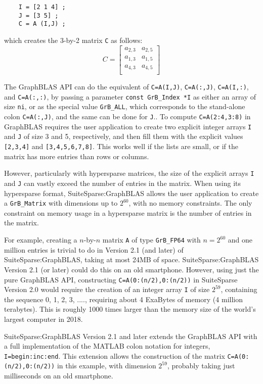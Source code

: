 \documentclass[12pt]{article}
\begin{document}
    {\footnotesize
    \begin{verbatim}
    I = [2 1 4] ;
    J = [3 5] ;
    C = A (I,J) ; \end{verbatim} }
\noindent
which creates the 3-by-2 matrix \verb'C' as follows:
\[
C =
\left[
\begin{array}{cc}
a_{2,3} & a_{2,5} \\
a_{1,3} & a_{1,5} \\
a_{4,3} & a_{4,5} \\
\end{array}
\right]
\]

The GraphBLAS API can do the equivalent of \verb'C=A(I,J)',
\verb'C=A(:,J)', \verb'C=A(I,:)', and \verb'C=A(:,:)', by passing a parameter
\verb'const GrB_Index *I' as either an array of size \verb'ni', or as the
special value \verb'GrB_ALL', which corresponds to the stand-alone colon
\verb'C=A(:,J)', and the same can be done for \verb'J'..  To compute
\verb'C=A(2:4,3:8)' in GraphBLAS requires the user application to create two
explicit integer arrays \verb'I' and \verb'J' of size 3 and 5, respectively,
and then fill them with the explicit values \verb'[2,3,4]' and
\verb'[3,4,5,6,7,8]'.  This works well if the lists are small, or if the matrix
has more entries than rows or columns.

However, particularly with hypersparse matrices, the size of the explicit
arrays \verb'I' and \verb'J' can vastly exceed the number of entries in the
matrix.  When using its hypersparse format, SuiteSparse:GraphBLAS allows the
user application to create a \verb'GrB_Matrix' with dimensions up to $2^{60}$,
with no memory constraints.  The only constraint on memory usage in a
hypersparse matrix is the number of entries in the matrix.

For example, creating a $n$-by-$n$ matrix \verb'A' of type \verb'GrB_FP64' with
$n=2^{60}$ and one million entries is trivial to do in Version 2.1 (and later)
of SuiteSparse:GraphBLAS, taking at most 24MB of space.  SuiteSparse:GraphBLAS
Version 2.1 (or later) could do this on an old smartphone.  However, using just
the pure GraphBLAS API, constructing \verb'C=A(0:(n/2),0:(n/2))'
in SuiteSparse Version 2.0 would require the creation of an integer array
\verb'I' of size $2^{59}$, containing the sequence 0, 1, 2, 3, ...., requiring
about 4 ExaBytes of memory (4 million terabytes).  This is roughly 1000 times
larger than the memory size of the world's largest computer in 2018.

SuiteSparse:GraphBLAS Version 2.1 and later extends the GraphBLAS API with a
full implementation of the MATLAB colon notation for integers,
\verb'I=begin:inc:end'.  This extension allows the construction of the matrix
\verb'C=A(0:(n/2),0:(n/2))' in this example, with dimension $2^{59}$, probably
taking just milliseconds on an old smartphone.
\end{document}

